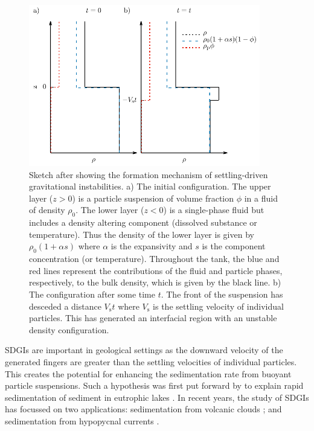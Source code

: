 \documentclass[authoryear,preprint,review,12pt]{elsarticle}
\begin{document}
\begin{figure}[ht!]
  \centerline{\includegraphics[width=0.9\textwidth]{dens_prof.pdf}}
  \caption{Sketch after \citet{Burns12} showing the formation mechanism of settling-driven gravitational instabilities. a) The initial configuration. The upper layer ($z > 0$) is a particle suspension of volume fraction $\phi$ in a fluid of density $\rho_{0}$. The lower layer ($z < 0$) is a single-phase fluid but includes a density altering component (dissolved substance or temperature). Thus the density of the lower layer is given by $\rho_{0}(1 + \alpha s)$ where $\alpha$ is the expansivity and $s$ is the component concentration (or temperature). Throughout the tank, the blue and red lines represent the contributions of the fluid and particle phases, respectively, to the bulk density, which is given by the black line. b) The configuration after some time $t$. The front of the suspension has desceded a distance $V_{\text{s}} t$ where $V_{\text{s}}$ is the settling velocity of individual particles. This has generated an interfacial region with an unstable density configuration.}
  \label{fig:dens_prof}
\end{figure}

SDGIs are important in geological settings as the downward velocity of the generated fingers are greater than the settling velocities of individual particles. This creates the potential for enhancing the sedimentation rate from buoyant particle suspensions. Such a hypothesis was first put forward by \citet{Bradley65} to explain rapid sedimentation of sediment in eutrophic lakes \citep{Nipkow20}. In recent years, the study of SDGIs has focussed on two applications: sedimentation from volcanic clouds \citep{Carrazo12, Manzella15, Scollo17, Fries21}; and sedimentation from hypopycnal currents \citep{Chen97, Parsons01, Snyder11, Rouhnia15, Rouhnia17, Jazi16, Jazi19}.
\end{document}
